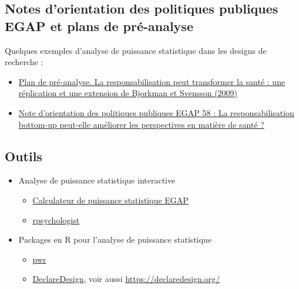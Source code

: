 \documentclass[
  12pt,
]{book}
\begin{document}
\hypertarget{notes-dorientation-des-politiques-publiques-egap-et-plans-de-pruxe9-analyse}{%
\subsection{Notes d'orientation des politiques publiques EGAP et plans de pré-analyse}\label{notes-dorientation-des-politiques-publiques-egap-et-plans-de-pruxe9-analyse}}

Quelques exemples d'analyse de puissance statistique dans les designs de recherche :

\begin{itemize}
\item
  \href{https://osf.io/qxwmu/}{Plan de pré-analyse. La responsabilisation peut transformer la santé : une réplication et une extension de Bjorkman et Svensson (2009)}
\item
  \href{https://egap.org/resource/does-bottom-up-accountability-work-evidence-from-uganda/}{Note d'orientation des politiques publiques EGAP 58 : La responsabilisation bottom-up peut-elle améliorer les perspectives en matière de santé ?}
\end{itemize}

\hypertarget{outils-3}{%
\subsection{Outils}\label{outils-3}}

\begin{itemize}
\item
  Analyse de puissance statistique interactive

  \begin{itemize}
  \item
    \href{https://egap.shinyapps.io/power-app/}{Calculateur de puissance statistique EGAP}
  \item
    \href{https://rpsychologist.com/d3/NHST/}{rpsychologist}
  \end{itemize}
\item
  Packages en R pour l'analyse de puissance statistique

  \begin{itemize}
  \item
    \href{https://cran.r-project.org/web/packages/pwr/index.html}{pwr}
  \item
    \href{https://cran.r-project.org/web/packages/DeclareDesign/index.html}{DeclareDesign}, voir aussi \url{https://declaredesign.org/}
  \end{itemize}
\end{itemize}
\end{document}
